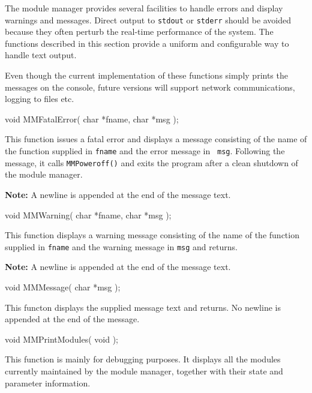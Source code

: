 \label{sec:errors}

The module manager provides several facilities to handle errors and display
warnings and messages. Direct output to {\tt stdout} or {\tt stderr} should
be avoided because they often perturb the real-time performance of the
system. The functions described in this section provide a uniform and
configurable way to handle text output.

Even though the current implementation of these functions simply prints the
messages on the console, future versions will support network
communications, logging to files etc.

\begin{prototype}
void MMFatalError( char *fname, char *msg );
\end{prototype}

This function issues a fatal error and displays a message consisting of the
name of the function supplied in {\tt fname} and the error message in {\tt
msg}. Following the message, it calls {\tt MMPoweroff()} and exits the
program after a clean shutdown of the module manager.

{\bf Note:} A newline is appended at the end of the message text.

\begin{prototype}
void MMWarning( char *fname, char *msg );
\end{prototype}

This function displays a warning message consisting of the name of the
function supplied in {\tt fname} and the warning message in {\tt msg} and
returns.

{\bf Note:} A newline is appended at the end of the message text.

\begin{prototype}
void MMMessage( char *msg );
\end{prototype}

This functon displays the supplied message text and returns. No newline is
appended at the end of the message.

\begin{prototype}
void MMPrintModules( void );
\end{prototype}

This function is mainly for debugging purposes. It displays all the modules
currently maintained by the module manager, together with their state and
parameter information.

